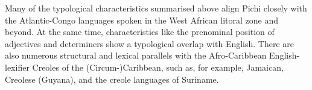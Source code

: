 Many of the typological characteristics summarised above align Pichi closely with the Atlantic-Congo languages spoken in the West African litoral zone and beyond. At the same time, characteristics like the prenominal position of adjectives and determiners show a typological overlap with English. There are also numerous structural and lexical parallels with the Afro-Caribbean English-lexifier Creoles of the (Circum-)Caribbean, such as, for example, Jamaican, Creolese (Guyana), and the creole languages of Suriname.

